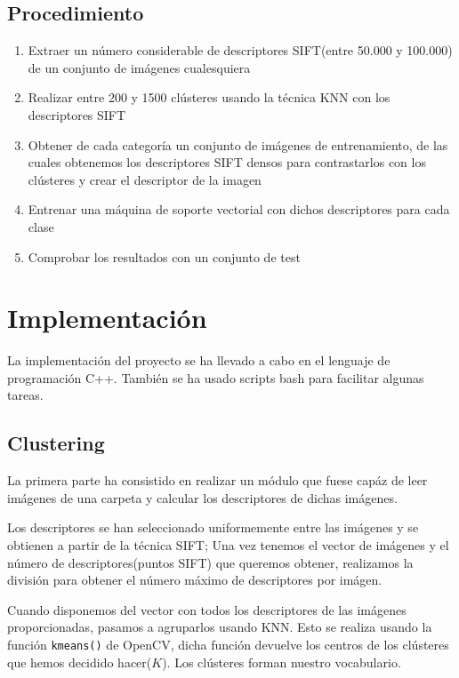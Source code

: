 \documentclass[a4paper,12pt]{article}
\begin{document}
\subsection{Procedimiento}
\begin{enumerate}
  \item Extraer un número considerable de descriptores SIFT(entre 50.000 y 
  100.000) de un conjunto de imágenes cualesquiera
  \item Realizar entre 200 y 1500 clústeres usando la técnica KNN con los
  descriptores SIFT
  \item Obtener de cada categoría un conjunto de imágenes de entrenamiento, de
  las cuales obtenemos los descriptores SIFT densos para contrastarlos con los
  clústeres y crear el descriptor de la imagen
  \item Entrenar una máquina de soporte vectorial con dichos descriptores para
  cada clase
  \item Comprobar los resultados con un conjunto de test
\end{enumerate}

\newpage
\section{Implementación}

La implementación del proyecto se ha llevado a cabo en el lenguaje de 
programación C++. También se ha usado scripts bash para facilitar algunas
tareas. 

\subsection{Clustering}

La primera parte ha consistido en realizar un módulo que fuese capáz de leer
imágenes de una carpeta y calcular los descriptores de dichas imágenes.

Los descriptores se han seleccionado uniformemente entre las imágenes y se 
obtienen a partir de la técnica SIFT; Una vez tenemos el vector de imágenes y
el número de descriptores(puntos SIFT) que queremos obtener, realizamos la 
división para obtener el número máximo de descriptores por imágen.

Cuando disponemos del vector con todos los descriptores de las imágenes 
proporcionadas, pasamos a agruparlos usando KNN. Esto se realiza usando
la función \texttt{kmeans()} de OpenCV, dicha función devuelve los centros
de los clústeres que hemos decidido hacer($K$). Los clústeres forman nuestro
vocabulario.
\end{document}
